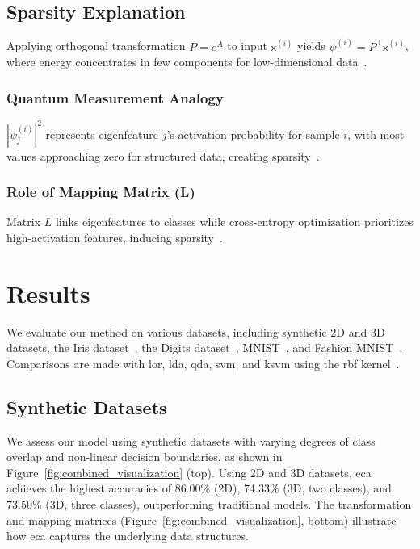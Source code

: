 \documentclass[lettersize,journal]{IEEEtran}
\begin{document}
\subsection{Sparsity Explanation} \label{sec:explanation} Applying orthogonal transformation $P = e^A$ to input $\mathsf{x}^{(i)}$ yields $\psi^{(i)} = P^\top \mathsf{x}^{(i)}$, where energy concentrates in few components for low-dimensional data~\cite{bandoh2009mathematical, tuqan2000state}.

\subsubsection{Quantum Measurement Analogy} $|\psi_j^{(i)}|^2$ represents eigenfeature $j$'s activation probability for sample $i$, with most values approaching zero for structured data, creating sparsity~\cite{nielsen2010quantum, lin2020sparsity}.

\subsubsection{Role of Mapping Matrix (L)} Matrix $L$ links eigenfeatures to classes while cross-entropy optimization prioritizes high-activation features, inducing sparsity~\cite{lin2020sparsity}.



\section{Results}
We evaluate our method on various datasets, including synthetic 2D and 3D datasets, the Iris dataset~\cite{fisher1936use}, the Digits dataset~\cite{alpaydin1998optical}, MNIST~\cite{lecun1998gradient}, and Fashion MNIST~\cite{xiao2017fashion}. Comparisons are made with \Gls{lor}, \Gls{lda}, \Gls{qda}, \Gls{svm}, and \Gls{ksvm} using the \Gls{rbf} kernel~\cite{hastie2009elements,cortes1995support}. 
\subsection{Synthetic Datasets} 
We assess our model using synthetic datasets with varying degrees of class overlap and non-linear decision boundaries, as shown in Figure~\ref{fig:combined_visualization} (top). Using 2D and 3D datasets, \gls{eca} achieves the highest accuracies of 86.00\% (2D), 74.33\% (3D, two classes), and 73.50\% (3D, three classes), outperforming traditional models. The transformation and mapping matrices (Figure~\ref{fig:combined_visualization}, bottom) illustrate how \gls{eca} captures the underlying data structures.
\end{document}

